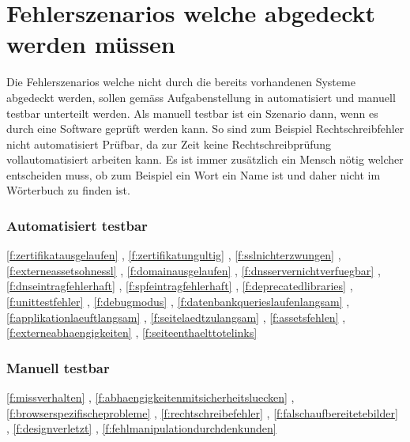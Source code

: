 \section{Fehlerszenarios welche abgedeckt werden müssen}
\label{sec:fehlerszenarios_welche_abgedeckt_werden_müssen}
Die Fehlerszenarios welche nicht durch die bereits vorhandenen Systeme abgedeckt werden, sollen gemäss Aufgabenstellung in automatisiert und manuell testbar unterteilt werden. Als manuell testbar ist ein Szenario dann, wenn es durch eine Software geprüft werden kann. So sind zum Beispiel Rechtschreibfehler nicht automatisiert Prüfbar, da zur Zeit keine Rechtschreibprüfung vollautomatisiert arbeiten kann. Es ist immer zusätzlich ein Mensch nötig welcher entscheiden muss, ob zum Beispiel ein Wort ein Name ist und daher nicht im Wörterbuch zu finden ist.

\subsubsection{Automatisiert testbar}
\label{ssub:automatisiert_testbar}

\ref{f:zertifikatausgelaufen} \fzertifikatausgelaufen, \ref{f:zertifikatungultig} \fzertifikatungultig, \ref{f:sslnichterzwungen} \fsslnichterzwungen, \ref{f:externeassetsohnessl} \fexterneassetsohnessl, \ref{f:domainausgelaufen} \fdomainausgelaufen, \ref{f:dnsservernichtverfuegbar} \fdnsservernichtverfuegbar, \ref{f:dnseintragfehlerhaft} \fdnseintragfehlerhaft, \ref{f:spfeintragfehlerhaft} \fspfeintragfehlerhaft, \ref{f:deprecatedlibraries} \fdeprecatedlibraries, \ref{f:unittestfehler} \funittestfehler, \ref{f:debugmodus} \fdebugmodus, \ref{f:datenbankquerieslaufenlangsam} \fdatenbankquerieslaufenlangsam, \ref{f:applikationlaeuftlangsam} \fapplikationlaeuftlangsam, \ref{f:seitelaedtzulangsam} \fseitelaedtzulangsam, \ref{f:assetsfehlen} \fassetsfehlen, \ref{f:externeabhaengigkeiten} \fassetsfehlen, \ref{f:seiteenthaelttotelinks} \fseiteenthaelttotelinks

\subsubsection{Manuell testbar}
\label{ssub:manuel_testbar}

\ref{f:missverhalten} \fmissverhalten, \ref{f:abhaengigkeitenmitsicherheitsluecken} \fabhaengigkeitenmitsicherheitsluecken, \ref{f:browserspezifischeprobleme} \fbrowserspezifischeprobleme, \ref{f:rechtschreibefehler} \frechtschreibefehler, \ref{f:falschaufbereitetebilder} \ffalschaufbereitetebilder, \ref{f:designverletzt} \fdesignverletzt, \ref{f:fehlmanipulationdurchdenkunden} \ffehlmanipulationdurchdenkunden
